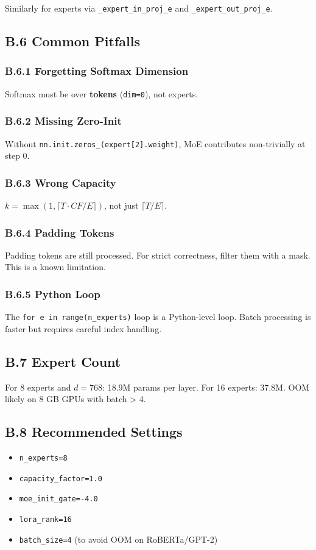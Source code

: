 Similarly for experts via \texttt{\_expert\_in\_proj\_{e}} and \texttt{\_expert\_out\_proj\_{e}}.

\subsection{B.6 Common Pitfalls}

\subsubsection{B.6.1 Forgetting Softmax Dimension}

Softmax must be over \textbf{tokens} (\texttt{dim=0}), not experts.

\subsubsection{B.6.2 Missing Zero-Init}

Without \texttt{nn.init.zeros\_(expert[2].weight)}, MoE contributes non-trivially 
at step 0.

\subsubsection{B.6.3 Wrong Capacity}

$k = \max(1, \lceil T \cdot CF / E \rceil)$, not just $\lceil T/E \rceil$.

\subsubsection{B.6.4 Padding Tokens}

Padding tokens are still processed. For strict correctness, filter them 
with a mask. This is a known limitation.

\subsubsection{B.6.5 Python Loop}

The \texttt{for e in range(n\_experts)} loop is a Python-level loop. Batch 
processing is faster but requires careful index handling.

\subsection{B.7 Expert Count}

For 8 experts and $d = 768$: 18.9M params per layer. For 16 experts: 
37.8M. OOM likely on 8 GB GPUs with batch \textgreater{} 4.

\subsection{B.8 Recommended Settings}

\begin{itemize}
\item \texttt{n\_experts=8}
\item \texttt{capacity\_factor=1.0}
\item \texttt{moe\_init\_gate=-4.0}
\item \texttt{lora\_rank=16}
\item \texttt{batch\_size=4} (to avoid OOM on RoBERTa/GPT-2)

\end{itemize}
